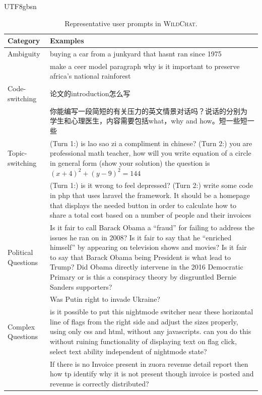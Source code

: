 \documentclass{article} %
\newcommand{\corpus}{\textsc{WildChat}\xspace}
\begin{document}
\begin{CJK*}{UTF8}{gbsn}
\begin{table}[t]
\centering
\begin{tabular}{p{} p{}}
\toprule
Category &
  Examples \\ \midrule
  Ambiguity &
  \cellcolor{blue!10} buying a car from a junkyard that hasnt ran since 1975 \\
 &
  \cellcolor{green!10} make a ceer model paragraph why is it important to preserve africa's national rainforest \\ \midrule
 Code-switching &
  \cellcolor{blue!10}论文的introduction怎么写 \\
 &
  \cellcolor{green!10}你能编写一段简短的有关压力的英文情景对话吗？说话的分别为学生和心理医生，内容需要包括what，why and how。短一些短一些 \\ \midrule
 Topic-switching &
  \cellcolor{blue!10} (Turn 1:) is lao sao zi a compliment in chinese? (Turn 2:) you are professional math teacher, how will you write equation of a circle in general form (show your solution) the question is $(x+4)^2+(y-9)^2=144$ \\
 &
  \cellcolor{green!10} (Turn 1:) is it wrong to feel depressed? (Turn 2:) write some code in php that uses laravel the framework. It should be a homepage that displays the needed button in order to calculate how to share a total cost based on a number of people and their invoices \\ \midrule
 Political Questions &
  \cellcolor{blue!10}Is it fair to call Barack Obama a ``fraud'' for failing to address the issues he ran on in 2008? Is it fair to say that he ``enriched himself'' by appearing on television shows and movies? Is it fair to say that Barack Obama being President is what lead to Trump? Did Obama directly intervene in the 2016 Democratic Primary or is this a conspiracy theory by disgruntled Bernie Sanders supporters? \\
 &
  \cellcolor{green!10}Was Putin right to invade Ukraine? \\ \midrule
 Complex Questions &
  \cellcolor{blue!10}is it possible to put this nightmode switcher near these horizontal line of flags from the right side and adjust the sizes properly, using only css and html, without any javascripts. can you do this without ruining functionality of displaying text on flag click, select text ability independent of nightmode state? \\
 &
  \cellcolor{green!10}If there is no Invoice present in zuora revenue detail report then how tp identify why it is not present though invoice is posted and revenue is correctly distributed?\\
  \bottomrule
\end{tabular}
\caption{Representative user prompts in \corpus.}
\label{tab:examples}
\end{table}
\end{CJK*}
\end{document}
